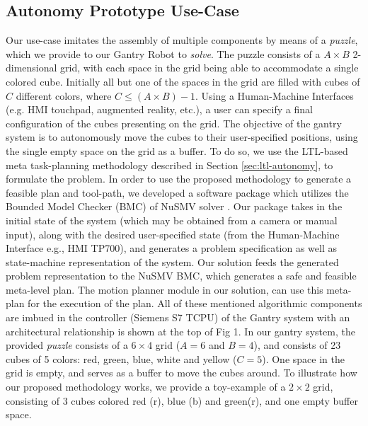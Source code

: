 \documentclass[3p,twocolumn,times,procedia]{elsarticle}
\begin{document}
\subsection{Autonomy Prototype Use-Case}
Our use-case imitates the assembly of multiple components by means of a \textit{puzzle}, which we provide to our Gantry Robot to \textit{solve}. The puzzle consists of a $A\times B$ 2-dimensional grid, with each space in the grid being able to accommodate a single colored cube. Initially all but one of the spaces in the grid are filled with cubes of $C$ different colors, where $C \leq (A\times B) -1$. Using a Human-Machine Interfaces (e.g. HMI touchpad, augmented reality, etc.), a user can specify a final configuration of the cubes presenting on the grid. The objective of the gantry system is to autonomously move the cubes to their user-specified positions, using the single empty space on the grid as a buffer. To do so, we use the LTL-based meta task-planning methodology described in Section \ref{sec:ltl-autonomy}, to formulate the problem. 
In order to use the proposed methodology to generate a feasible plan and tool-path, we developed a software package which utilizes the Bounded Model Checker (BMC) of NuSMV solver \cite{nusmv2}. Our package takes in the initial state of the system (which may be obtained from a camera or manual input), along with the desired user-specified state (from the Human-Machine Interface e.g., HMI TP700), and generates a problem specification as well as state-machine representation of the system. Our solution feeds the generated problem representation to the NuSMV BMC, which generates a safe and feasible meta-level plan. The motion planner module in our solution, can use this meta-plan for the execution of the plan. All of these mentioned algorithmic components are imbued in the controller (Siemens S7 TCPU) of the Gantry system with an architectural relationship is shown at the top of Fig 1.
In our gantry system, the provided \textit{puzzle} consists of a $6\times 4$ grid ($A=6$ and $B=4$), and consists of 23 cubes of 5 colors: red, green, blue, white and yellow ($C=5$). One space in the grid is empty, and serves as a buffer to move the cubes around. To illustrate how our proposed methodology works, we provide a toy-example of a $2\times 2$ grid, consisting of 3 cubes colored red (r), blue (b) and green(r), and one empty buffer space. 
\end{document}
